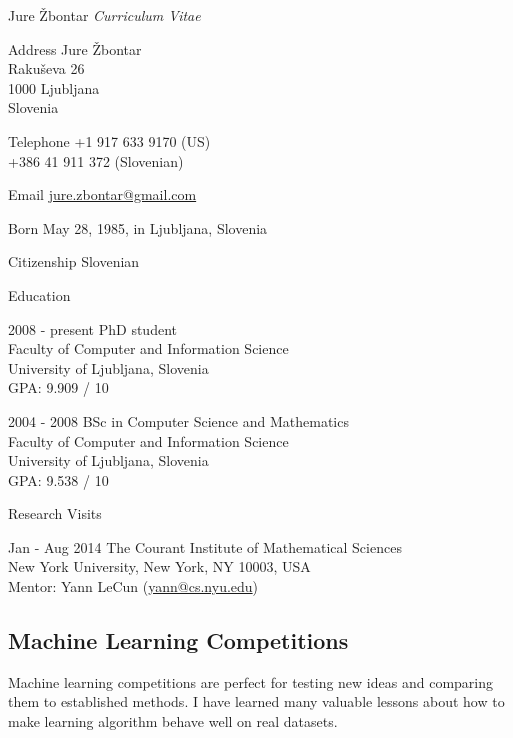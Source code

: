 \documentclass[12pt,a4paper]{article}
\begin{document}
\begin{cv}{Jure \v{Z}bontar}
\noindent \emph{Curriculum Vitae}

\begin{cvlist}{}
\item[Address] Jure \v{Z}bontar \\
Raku\v{s}eva 26 \\
1000 Ljubljana \\
Slovenia

\item[Telephone] 
+1 917 633 9170 (US) \\
+386 41 911 372 (Slovenian)

\item[Email] \href{mailto:jure.zbontar@gmail.com}{jure.zbontar@gmail.com}

\item[Born] May 28, 1985, in Ljubljana, Slovenia
\item[Citizenship] Slovenian

\end{cvlist}

\begin{cvlist}{Education}
\item[2008 - present] PhD student \\
Faculty of Computer and Information Science \\
University of Ljubljana, Slovenia \\
GPA: 9.909 / 10

\item[2004 - 2008] BSc in Computer Science and Mathematics \\
Faculty of Computer and Information Science \\
University of Ljubljana, Slovenia \\
GPA: 9.538 / 10

\end{cvlist}

\begin{cvlist}{Research Visits}
\item[Jan - Aug 2014] The Courant Institute of Mathematical Sciences \\
New York University, New York, NY 10003, USA \\
Mentor: Yann LeCun (\href{mailto:yann@cs.nyu.edu}{yann@cs.nyu.edu})
\end{cvlist}

\subsection*{Machine Learning Competitions}
Machine learning competitions are perfect for testing new ideas and
comparing them to established methods. I have learned many valuable
lessons about how to make learning algorithm behave well on real datasets.


\end{cv}
\end{document}
